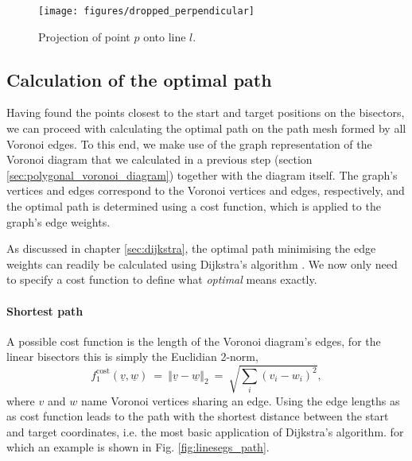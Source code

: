 \begin{figure}[htb]
	\begin{center}
		\texttt{[image: figures/dropped\_perpendicular]}
	\end{center}
	\caption[Projection of a point onto a line.]{Projection of point $p$ onto line $l$.
		\label{fig:dropped_perpendicular}}
\end{figure}



\subsection{Calculation of the optimal path}
\label{sec:optimalpath}

Having found the points closest to the start and target positions on the bisectors, we can
proceed with calculating the optimal path on the path mesh formed by all Voronoi edges.
To this end, we make use of the graph representation of the Voronoi diagram that we calculated
in a previous step (section \ref{sec:polygonal_voronoi_diagram}) together with the diagram itself.
The graph's vertices and edges correspond to the Voronoi vertices and edges, respectively,
and the optimal path is determined using a cost function, which is applied to the graph's edge weights.

As discussed in chapter \ref{sec:dijkstra}, the optimal path minimising the edge weights 
can readily be calculated using Dijkstra's algorithm \cite{wiki_dijkstra}.
We now only need to specify a cost function to define what \textit{optimal} means exactly.

\paragraph{Shortest path}
A possible cost function is the length of the Voronoi diagram's edges, for the linear bisectors
this is simply the Euclidian 2-norm,
\begin{equation}
	f^{\mathrm{cost}}_1\left(\underline{v}, \underline{w} \right) \ = \ 
	\left\Vert \underline{v} - \underline{w} \right\Vert_2 \ =\ \sqrt{\sum_i \left(v_i - w_i\right)^2},
\end{equation}
where $v$ and $w$ name Voronoi vertices sharing an edge.
Using the edge lengths as as cost function leads to the path with the shortest distance 
between the start and target coordinates, i.e. the most basic application of Dijkstra's algorithm.
for which an example is shown in Fig. \ref{fig:linesegs_path}.

